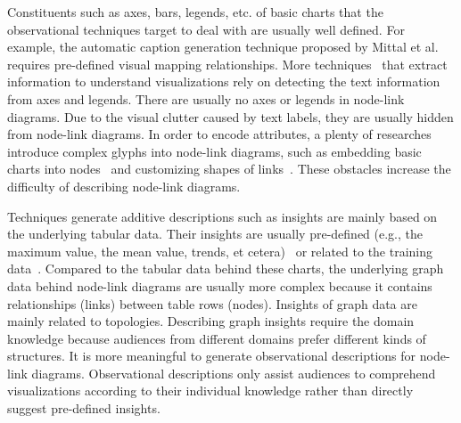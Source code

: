 Constituents such as axes, bars, legends, etc. of basic charts that the observational techniques target to deal with are usually well defined.
For example, the automatic caption generation technique proposed by Mittal et al.~\cite{DBLP:journals/coling/MittalMCR98} requires pre-defined visual mapping relationships.
More techniques~\cite{DBLP:conf/icip/ZhouT00, DBLP:conf/doceng/HuangT07, DBLP:conf/grec/HuangTL03} that extract information to understand visualizations rely on detecting the text information from axes and legends.
There are usually no axes or legends in node-link diagrams.
Due to the visual clutter caused by text labels, they are usually hidden from node-link diagrams.
In order to encode attributes, a plenty of researches introduce complex glyphs into node-link diagrams, such as embedding basic charts into nodes~\cite{gehlenborg2010visualization, DBLP:conf/iv/JusufiDK10} and customizing shapes of links~\cite{DBLP:conf/iv/SchoffelSE16, DBLP:journals/tvcg/NielsenJBJ09}.
These obstacles increase the difficulty of describing node-link diagrams.


Techniques generate additive descriptions such as insights are mainly based on the underlying tabular data.
Their insights are usually pre-defined (e.g., the maximum value, the mean value, trends, et cetera)~\cite{DBLP:journals/pvldb/DemiralpHPP17, DBLP:journals/tvcg/WangSZCXMZ20} or related to the training data~\cite{DBLP:conf/apvis/LiuXHWY20, DBLP:conf/chi/KimHA20}.
Compared to the tabular data behind these charts, the underlying graph data behind node-link diagrams are usually more complex because it contains relationships (links) between table rows (nodes).
Insights of graph data are mainly related to topologies.
Describing graph insights require the domain knowledge because audiences from different domains prefer different kinds of structures.
It is more meaningful to generate observational descriptions for node-link diagrams.
Observational descriptions only assist audiences to comprehend visualizations according to their individual knowledge rather than directly suggest pre-defined insights.


